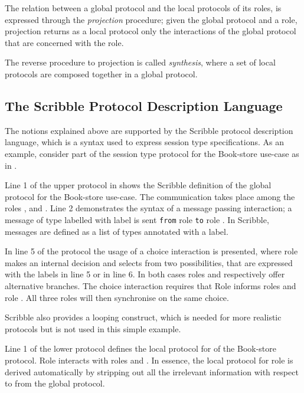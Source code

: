 The relation between a global protocol and the
local protocols of its roles, is expressed
through the {\em projection} procedure;
given the global protocol and a role, projection
returns as a local protocol only the
interactions of the global protocol that are concerned with
the role.

The reverse procedure to projection is called {\em synthesis},
where a set of local protocols are composed together in a global
protocol.

\subsection{The Scribble Protocol Description Language}
\label{sec:scribble}
The notions explained above are supported by the
Scribble protocol description language,
which is a syntax used to express session type specifications.
As an example,
consider part of the session type protocol for the Book-store
use-case as in . 




Line 1 of the upper protocol in  shows the
Scribble definition of the global protocol for the Book-store use-case.
The communication takes place
among the roles \BuyerOne, \BuyerTwo and \Seller. Line 2 demonstrates
the syntax of a message passing interaction; a message
of type  labelled with label  is sent \lstinline|from|
role \BuyerOne \lstinline|to| role \Seller. In Scribble, messages are
defined as a list of types annotated with a label.

In line 5 of the protocol 
the usage of a choice interaction is presented,
where role \BuyerTwo makes an internal decision and selects
from two possibilities, that are
expressed with the labels  in line 5 or  in line 6.
In  both cases roles \BuyerOne and \Seller respectively offer
alternative branches. The choice interaction requires that
Role \BuyerTwo informs roles \BuyerOne and role \Seller. All
three roles will then synchronise on the same choice.

Scribble also provides a looping construct, which is needed for more realistic protocols but is not used in this simple example.


Line 1 of the lower protocol defines the local protocol 
for \BuyerOne of the Book-store protocol. Role \BuyerOne
interacts with roles \BuyerTwo and \Seller. In essence,
the local protocol for role \BuyerOne is derived automatically
by stripping out all the irrelevant information with respect
to \BuyerOne from the global protocol.

